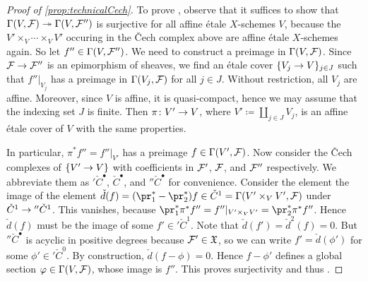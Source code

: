 \documentclass[a4paper, 10pt, oneside, DIV=9, chapterprefix=true, numbers=enddot, bibliography=totoc]{scrbook}
\begin{document}
\begin{proof}[Proof of \cref{prop:technicalCech}]
	To prove \itememph{*}, observe that it suffices to show that $\Global(V,\Ff)\epimorphism \Global(V,\Ff'')$ is surjective for all affine étale $X$-schemes $V$, because the $V'\times_V\dotsb\times_VV'$ occuring in the \v Cech complex above are affine étale $X$-schemes again. So let $f''\in \operatorname{\Gamma}(V,\mathcal{F}'')$. We need to construct a preimage in $\operatorname{\Gamma}(V,\mathcal{F})$. Since $\Ff\morphism\Ff''$ is an epimorphism of sheaves, we find an étale cover $\{V_j\morphism V\}_{j\in J}$ such that $f''|_{V_j}$ has a preimage in $\operatorname{\Gamma}(V_j,\mathcal{F})$ for all $j\in J$. Without restriction, all $V_j$ are affine. Moreover, since $V$ is affine, it is quasi-compact, hence we may assume that the indexing set $J$ is finite. Then $\pi\colon V'\morphism V$, where $V'\coloneqq\coprod_{j\in J}V_j$, is an affine étale cover of $V$ with the same properties.
	
	In particular, $\pi^*f''=f''|_{V'}$ has a preimage $f\in \operatorname{\Gamma}(V',\mathcal{F})$. Now consider the \v Cech complexes of $\{V'\morphism V\}$ with coefficients in $\mathcal{F}'$, $\mathcal{F}$, and $\mathcal{F}''$ respectively. We abbreviate them as $'\check{C}^\bullet$, $\check{C}^\bullet$, and $''\check{C}^\bullet$ for convenience. Consider the element the image of the element $\check{d}(f)=(\pr_1^*-\pr_2^*)f\in \check{C}^1=\Global(V'\times_VV',\Ff)$ under $\check{C}^1\morphism {''\check{C}^1}$. This vanishes, because $\pr_1^*\pi^*f''=f''|_{V'\times_VV'}=\pr_2^*\pi^*f''$. Hence $\check{d}(f)$ must be the image of some $f'\in {'\check{C}^1}$. Note that $\check{d}(f')=\check{d}^2(f)=0$. But $''\check{C}^\bullet$ is acyclic in positive degrees because $\mathcal{F}'\in \mathfrak{X}$, so we can write $f'=\check{d}(\phi')$ for some $\phi'\in {'\check{C}^0}$. By construction, $\check{d}(f-\phi)=0$. Hence $f-\phi'$ defines a global section $\varphi\in \operatorname{\Gamma}(V,\mathcal{F})$, whose image is $f''$. This proves surjectivity and thus \itememph{*}.
	

\end{proof}
\end{document}
